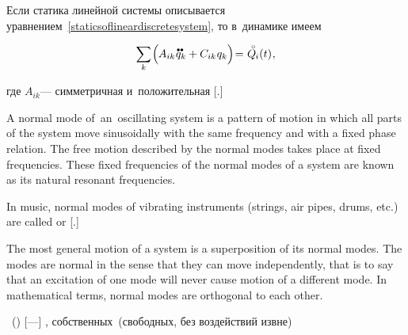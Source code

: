 \label{para:smalloscillations}

\begin{otherlanguage}{russian}

Если статика линейной системы описывается уравнением~\eqref{staticsoflineardiscretesystem}, то в~динамике имеем

\nopagebreak\vspace{-0.4em}\begin{equation}\label{dynamicsoflineardiscretesystem}
\scalebox{0.95}[1]{$\displaystyle \sum_{\smash{k}}$} \hspace{-0.2ex} \left(^{\mathstrut} \hspace{-0.2ex} A_{ik} \hspace{.12ex} \mathdotdotabove{q}_k + C_{ik} \hspace{.12ex} q_k \right) \hspace{-0.4ex}
= \hspace{.1ex} \mathcircabove{Q}_{\hspace{-0.1ex}i}(t) \hspace{.1ex} ,
\vspace{-0.1em}\end{equation}

\vspace{-0.25em} \noindent где ${A_{ik}}$\:--- симметричная и~положительная [.]

{\small%
A normal mode of~an~oscillating system is a pattern of motion in which all parts of the system move sinusoidally with the same frequency and with a fixed phase relation. The free motion described by the normal modes takes place at fixed frequencies. These fixed frequencies of the normal modes of a system are known as its natural resonant frequencies.

In music, normal modes of vibrating instruments (strings, air pipes, drums, etc.) are called  or [.]

The most general motion of a system is a superposition of its normal modes. The modes are normal in the sense that they can move independently, that is to say that an excitation of one mode will never cause motion of a different mode. In mathematical terms, normal modes are orthogonal to each other.
\par}

  ~() [---] , собственных~(свободных, без воздействий извне)  


\end{otherlanguage}
